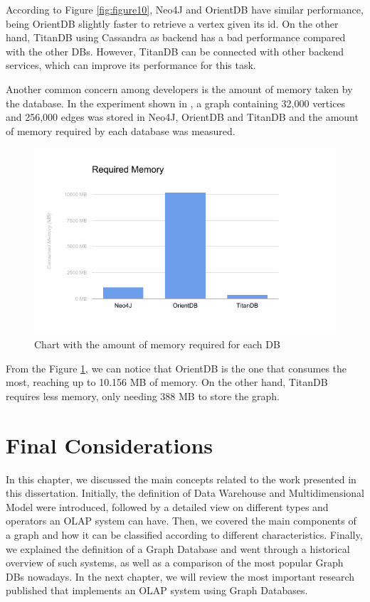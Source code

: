 According to Figure \ref{fig:figure10}, Neo4J and OrientDB have similar performance, being OrientDB slightly faster to retrieve a vertex given its id. On the other hand, TitanDB using Cassandra as backend has a bad performance compared with the other DBs. However, TitanDB can be connected with other backend services, which can improve its performance for this task.
 
Another common concern among developers is the amount of memory taken by the database. In the experiment shown in \cite{mccoll2014performance}, a graph containing 32,000 vertices and 256,000 edges was stored in Neo4J, OrientDB and TitanDB and the amount of memory required by each database was measured.

\begin{figure}[!h]
\centering
\includegraphics[width=1\textwidth]{../memory_test.png}
\caption{Chart with the amount of memory required for each DB \cite{mccoll2014performance}}
\label{fig:figure11}
\end{figure}

From the Figure \ref{fig:figure11}, we can notice that OrientDB is the one that consumes the most, reaching up to 10.156 MB of memory. On the other hand, TitanDB requires less memory, only needing 388 MB to store the graph.

\section{Final Considerations}
In this chapter, we discussed the main concepts related to the work presented in this dissertation. Initially, the definition of Data Warehouse and Multidimensional Model were introduced, followed by a detailed view on different types and operators an OLAP system can have. Then, we covered the main components of a graph and how it can be classified according to different characteristics. Finally, we explained the definition of a Graph Database and went through a historical overview of such systems, as well as a comparison of the most popular Graph DBs nowadays. In the next chapter, we will review the most important research published that implements an OLAP system using Graph Databases.
